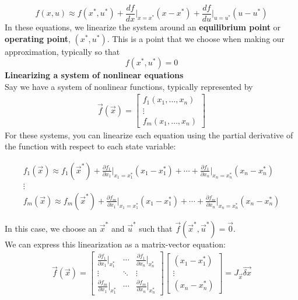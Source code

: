     $$\boxed{f(x, u) \approx f(x^*, u^*) + \frac{df}{dx} \bigg\rvert_{x = x^*} (x - x^*) + \frac{df}{du} \bigg\rvert_{u = u^*} (u - u^*)}$$
    In these equations, we linearize the system around an \textbf{equilibrium point} or \textbf{operating point}, $(x^*, u^*)$.
    This is a point that we choose when making our approximation, typically so that
    $$f(x^*, u^*) = 0$$
    \newline
    \textbf{Linearizing a system of nonlinear equations} \\
    \newline
    Say we have a system of nonlinear functions, typically represented by
    \begin{align*}
        \vec{f}(\vec{x}) = \begin{bmatrix}
            f_1(x_1, \dots, x_n) \\
            \vdots \\
            f_m(x_1, \dots, x_n)
        \end{bmatrix}
    \end{align*}
    For these systems, you can linearize each equation using the partial derivative of the function with respect to each state variable:
    \begin{center}
        \begin{align*}
            f_1(\vec{x}) \approx f_1(\vec{x}^*) + \frac{\partial f_1}{\partial x_1} \bigg\rvert_{x_1 = x_1^*} (x_1 - x_1^*) + \cdots + \frac{\partial f_1}{\partial x_n} \bigg\rvert_{x_n = x_n^*} (x_n - x_n^*) \\
            \vdots \\
            f_m(\vec{x}) \approx f_m(\vec{x}^*) + \frac{\partial f_m}{\partial x_1} \bigg\rvert_{x_1 = x_1^*} (x_1 - x_1^*) + \cdots + \frac{\partial f_m}{\partial x_n} \bigg\rvert_{x_n = x_n^*} (x_n - x_n^*)
        \end{align*}
    \end{center}
    In this case, we choose an $\vec{x}^*$ and $\vec{u}^*$ such that $\vec{f}(\vec{x}^*, \vec{u}^*) = \vec{0}$. \\
    \newline
    We can express this linearization as a matrix-vector equation:
    \begin{align*}
        \vec{f}(\vec{x}) = \begin{bmatrix}
            \frac{\partial f_1}{\partial x_1} \bigg\rvert_{x_1^*} & \cdots & \frac{\partial f_1}{\partial x_n} \bigg\rvert_{x_n^*} \\
            \vdots & \ddots & \vdots \\
            \frac{\partial f_m}{\partial x_1} \bigg\rvert_{x_1^*} & \cdots & \frac{\partial f_m}{\partial x_n} \bigg\rvert_{x_n^*}
        \end{bmatrix} \begin{bmatrix}
            (x_1 - x_1^*) \\
            \vdots \\
            (x_n - x_n^*)
        \end{bmatrix} = \boxed{J_{\vec{x}} \vec{\delta x}}
    \end{align*}
